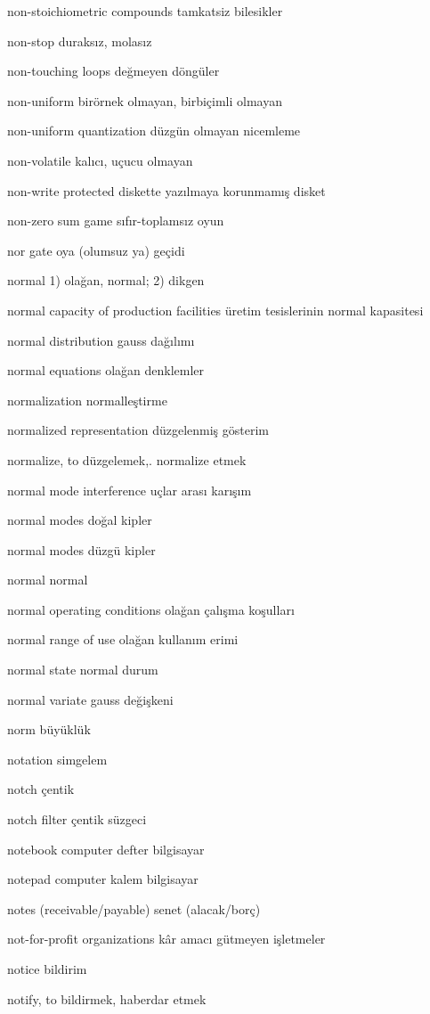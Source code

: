 \documentclass[12pt,fleqn]{article}\usepackage{../../common}
\begin{document}
non-stoichiometric compounds tamkatsiz bilesikler

non-stop duraksız, molasız

non-touching loops değmeyen döngüler

non-uniform birörnek olmayan, birbiçimli olmayan

non-uniform quantization düzgün olmayan nicemleme

non-volatile kalıcı, uçucu olmayan

non-write protected diskette yazılmaya korunmamış disket

non-zero sum game sıfır-toplamsız oyun

nor gate oya (olumsuz ya) geçidi

normal 1) olağan, normal; 2) dikgen

normal capacity of production facilities üretim tesislerinin normal kapasitesi

normal distribution gauss dağılımı

normal equations olağan denklemler

normalization normalleştirme

normalized representation düzgelenmiş gösterim

normalize, to düzgelemek,. normalize etmek

normal mode interference uçlar arası karışım

normal modes doğal kipler

normal modes düzgü kipler

normal normal

normal operating conditions olağan çalışma koşulları

normal range of use olağan kullanım erimi

normal state normal durum

normal variate gauss değişkeni

norm büyüklük

notation simgelem

notch çentik

notch filter çentik süzgeci

notebook computer defter bilgisayar

notepad computer kalem bilgisayar

notes (receivable/payable) senet (alacak/borç)

not-for-profit organizations kâr amacı gütmeyen işletmeler

notice bildirim

notify, to bildirmek, haberdar etmek
\end{document}

